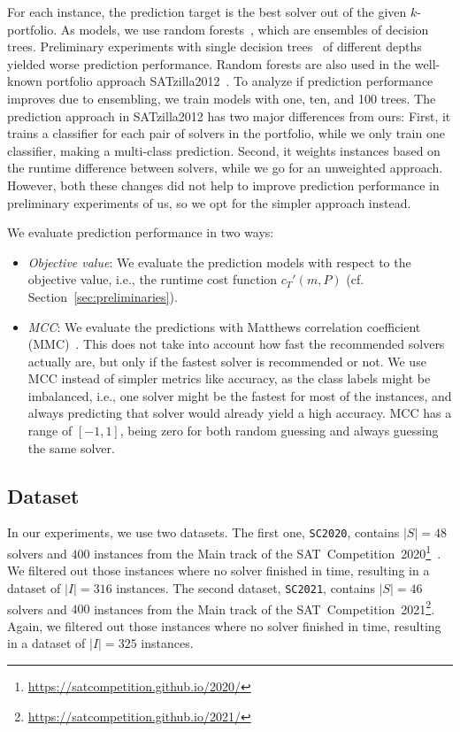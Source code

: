 \documentclass[conference]{IEEEtran}
\begin{document}
For each instance, the prediction target is the best solver out of the given $k$-portfolio.
As models, we use random forests~\cite{breiman2001random}, which are ensembles of decision trees. 
Preliminary experiments with single decision trees~\cite{breiman1984classification} of different depths yielded worse prediction performance. 
Random forests are also used in the well-known portfolio approach SATzilla2012~\cite{xu2012satzilla2012}. 
To analyze if prediction performance improves due to ensembling, we train models with one, ten, and 100 trees.
The prediction approach in SATzilla2012 has two major differences from ours:
First, it trains a classifier for each pair of solvers in the portfolio, while we only train one classifier, making a multi-class prediction.
Second, it weights instances based on the runtime difference between solvers, while we go for an unweighted approach.
However, both these changes did not help to improve prediction performance in preliminary experiments of us, so we opt for the simpler approach instead.

We evaluate prediction performance in two ways:

\begin{itemize}
	\item \emph{Objective value}:
	We evaluate the prediction models with respect to the objective value, i.e., the runtime cost function $c_{T}'(m,P)$ (cf. Section~\ref{sec:preliminaries}). 
	\item \emph{MCC}:
	We evaluate the predictions with Matthews correlation coefficient (MMC)~\cite{matthews1975comparison, gorodkin2004comparing}.
	This does not take into account how fast the recommended solvers actually are, but only if the fastest solver is recommended or not.
	We use MCC instead of simpler metrics like accuracy, as the class labels might be imbalanced, i.e., one solver might be the fastest for most of the instances, and always predicting that solver would already yield a high accuracy.
	MCC has a range of $[-1,1]$, being zero for both random guessing and always guessing the same solver.
\end{itemize}

\subsection{Dataset}

In our experiments, we use two datasets.
The first one, \texttt{SC2020}, contains $|S| = 48$ solvers and $400$ instances from the Main track of the SAT~Competition~2020\footnote{\url{https://satcompetition.github.io/2020/}}~\cite{balyo2020proceedings, SC2020:AIJ}.
We filtered out those instances where no solver finished in time, resulting in a dataset of $|I| = 316$ instances. 
The second dataset, \texttt{SC2021}, contains $|S| = 46$ solvers and $400$ instances from the Main track of the SAT~Competition~2021\footnote{\url{https://satcompetition.github.io/2021/}}.
Again, we filtered out those instances where no solver finished in time, resulting in a dataset of $|I| = 325$ instances.
\end{document}

